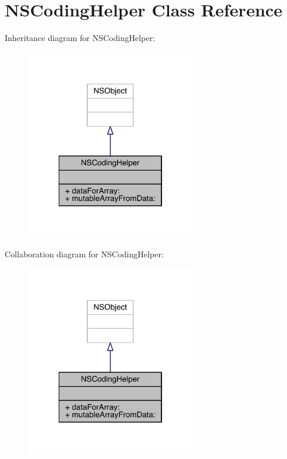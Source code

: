 \hypertarget{interface_n_s_coding_helper}{\section{N\-S\-Coding\-Helper Class Reference}
\label{interface_n_s_coding_helper}
}


Inheritance diagram for N\-S\-Coding\-Helper\-:\nopagebreak
\begin{figure}[H]
\begin{center}
\leavevmode
\includegraphics[width=210pt]{interface_n_s_coding_helper__inherit__graph}
\end{center}
\end{figure}


Collaboration diagram for N\-S\-Coding\-Helper\-:\nopagebreak
\begin{figure}[H]
\begin{center}
\leavevmode
\includegraphics[width=210pt]{interface_n_s_coding_helper__coll__graph}
\end{center}
\end{figure}
